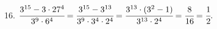 16. $\cfrac{3^{15}-3\cdot27^4}{3^9\cdot6^4}=\cfrac{3^{15}-3^{13}}{3^9\cdot3^4\cdot2^4}=\cfrac{3^{13}\cdot(3^2-1)}{3^{13}\cdot2^4}=\cfrac{8}{16}=\cfrac{1}{2}.$\\

